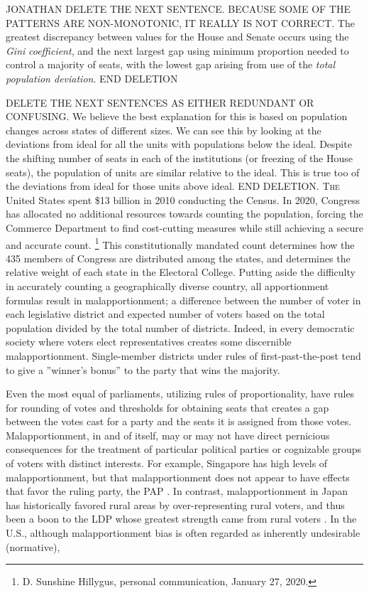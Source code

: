  JONATHAN DELETE THE NEXT SENTENCE. BECAUSE SOME OF THE PATTERNS ARE NON-MONOTONIC, IT REALLY IS NOT CORRECT. The greatest discrepancy between values for the House and Senate occurs using the \textit{Gini} \textit{coefficient}, and the next largest gap using minimum proportion needed to control a majority of seats, with the lowest gap arising from use of the \textit{total population deviation}. END DELETION
 
 DELETE THE NEXT SENTENCES AS EITHER REDUNDANT OR CONFUSING. We believe the best explanation for this is based on population changes across states of different sizes. We can see this by looking at the deviations from ideal for all the units with populations below the ideal. Despite the shifting number of seats in each of the institutions (or freezing of the House seats), the population of units are similar relative to the ideal. This is true too of the deviations from ideal for those units above ideal. END DELETION.
\lettrine[lines=5]{T}{he} United States spent \$13 billion in 2010 conducting the Census. In 2020, Congress has allocated no additional resources towards counting the population, forcing the Commerce Department to find cost-cutting measures while still achieving a secure and accurate count.
            \footnote{D. Sunshine Hillygus, personal communication, January 27, 2020.}
This constitutionally mandated count determines how the 435 members of Congress are distributed among the states, and determines the relative weight of each state in the Electoral College. Putting aside the difficulty in accurately counting a geographically diverse country, all apportionment formulas result in malapportionment; a difference between the number of voter in each legislative district and expected number of voters based on the total population divided by the total number of districts. Indeed, in every democratic society where voters elect representatives creates some discernible malapportionment. Single-member districts under rules of first-past-the-post tend to give a ''winner's bonus'' to the party that wins the majority. 

Even the most equal of parliaments, utilizing rules of proportionality, have rules for rounding of votes and thresholds for obtaining seats that creates a gap between the votes cast for a party and the seats it is assigned from those votes. Malapportionment, in and of itself, may or may not have direct pernicious consequences for the treatment of particular political parties or cognizable groups of voters with distinct interests. For example, Singapore has high levels of malapportionment, but that malapportionment does not appear to have effects that favor the ruling party, the PAP \citep{Tan2018}. In contrast, malapportionment in Japan has historically favored rural areas by over-representing rural voters, and thus been a boon to the LDP whose greatest strength came from rural voters . In the U.S., although malapportionment bias is often regarded as inherently undesirable (normative), %

